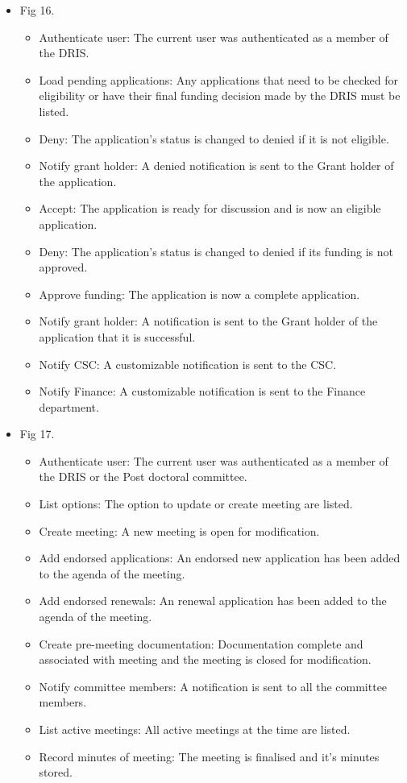 \documentclass[12pt]{article}
\begin{document}
\begin{itemize}
	\item Fig 16.
		\begin{itemize}
			\item Authenticate user: The current user was authenticated as a member of the DRIS.
			\item Load pending applications: Any applications that need to be checked for eligibility or have their final funding decision made by the DRIS must be listed.
			\item Deny: The application's status is changed to denied if it is not eligible. 
			\item Notify grant holder: A denied notification is sent to the Grant holder of the application.
			\item Accept: The application is ready for discussion and is now an eligible application.			
			\item Deny: The application's status is changed to denied if its funding is not approved.			
			\item Approve funding: The application is now a complete application.
			\item Notify grant holder: A notification is sent to the Grant holder of the application that it is successful.
			\item Notify CSC: A customizable notification is sent to the CSC.
			\item Notify Finance: A customizable notification is sent to the Finance department.									
		\end{itemize}
	
	\item Fig 17.
		\begin{itemize}
			\item Authenticate user: The current user was authenticated as a member of the DRIS or the Post doctoral committee.
			\item List options: The option to update or create meeting are listed.
			\item Create meeting: A new meeting is open for modification.
			\item Add endorsed applications: An endorsed new application has been added to the agenda of the meeting.
			\item Add endorsed renewals: An renewal application has been added to the agenda of the meeting.
			\item Create pre-meeting documentation: Documentation complete and associated with meeting and the meeting is closed for modification.
			\item Notify committee members: A notification is sent to all the committee members.
			\item List active meetings: All active meetings at the time are listed.
			\item Record minutes of meeting: The meeting is finalised and it's minutes stored.							
		\end{itemize}

\end{itemize}
\end{document}
